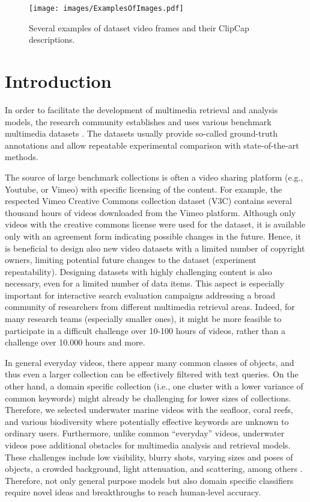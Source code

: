 \documentclass[runningheads]{llncs}
\begin{document}
\begin{figure*}
\begin{center}
    \centering
\texttt{[image: images/ExamplesOfImages.pdf]}
\end{center}
  \caption{Several examples of dataset video frames and their ClipCap descriptions.}
\label{fig:captioningExamples}
\end{figure*}

\section{Introduction}
\label{sec:introduction}
In order to facilitate the development of multimedia retrieval and analysis models, the research community establishes and uses various benchmark multimedia datasets \cite{krishna2017dense,xu2016msr,ZhouCVPR18,mithun2018learning,Youngjae2018eccv,chen2018temporally,krishna2017dense,xu2016msr,ZhouCVPR18}. The datasets usually provide so-called ground-truth annotations and allow repeatable experimental comparison with state-of-the-art methods.

The source of large benchmark collections is often a video sharing platform (e.g., Youtube, or Vimeo) with specific licensing of the content. For example, the respected Vimeo Creative Commons collection dataset (V3C) \cite{rossetto2019v3c} contains several thousand hours of videos downloaded from the Vimeo platform. Although only videos with the creative commons license were used for the dataset, it is available only with an agreement form indicating possible changes in the future. Hence, it is beneficial to design also new video datasets with a limited number of copyright owners, limiting potential future changes to the dataset (experiment repeatability). Designing datasets with highly challenging content is also necessary, even for a limited number of data items. This aspect is especially important for interactive search evaluation campaigns \cite{GurrinZH0DLTHRS22,HellerGBG0LLMPR22} addressing a broad community of researchers from different multimedia retrieval areas. Indeed, for many research teams (especially smaller ones), it might be more feasible to participate in a difficult challenge over 10-100 hours of videos, rather than a challenge over 10.000 hours and more.

In general everyday videos, there appear many common classes of objects, and thus even a larger collection can be effectively filtered with text queries. On the other hand, a domain specific collection (i.e., one cluster with a lower variance of common keywords) might already be challenging for lower sizes of collections. Therefore, we selected underwater marine videos with the seafloor, coral reefs, and various biodiversity where potentially effective keywords are unknown to ordinary users. Furthermore, unlike common ``everyday'' videos, underwater videos pose additional obstacles for multimedia analysis and retrieval models.
 These challenges include low visibility, blurry shots, varying sizes and poses of objects, a crowded background, light attenuation, and scattering, among others \cite{Levy2018}.
Therefore, not only general purpose models but also domain specific classifiers require novel ideas and breakthroughs to reach human-level accuracy.
 
\end{document}
